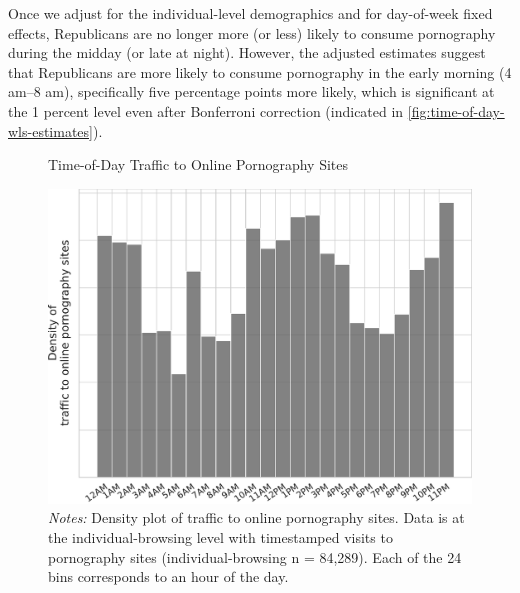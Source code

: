 \documentclass[12pt, letterpaper]{article}
\begin{document}
Once we adjust for the individual-level demographics and for day-of-week fixed effects, Republicans are no longer more (or less) likely to consume pornography during the midday (or late at night). However, the adjusted estimates suggest that Republicans are more likely to consume pornography in the early morning (4 am--8 am), specifically five percentage points more likely, which is significant at the 1 percent level even after Bonferroni correction (indicated in \cref{fig:time-of-day-wls-estimates}).

\begin{figure}[ht]
\centering
\caption{Time-of-Day Traffic to Online Pornography Sites}
    \includegraphics[width=.75\linewidth]{figs/time-of-day-consumption.pdf}
\caption*{\footnotesize \emph{Notes:} 
        Density plot of traffic to online pornography sites.
        Data is at the individual-browsing level with timestamped visits to pornography sites (individual-browsing n = 84,289).
        Each of the 24 bins corresponds to an hour of the day.
	}
    \label{fig:time-of-day-consumption}
\end{figure}
\end{document}
